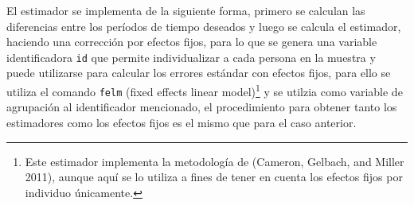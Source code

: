 \documentclass[]{article}
\begin{document}
El estimador se implementa de la siguiente forma, primero se calculan
las diferencias entre los períodos de tiempo deseados y luego se calcula
el estimador, haciendo una corrección por efectos fijos, para lo que se
genera una variable identificadora \texttt{id} que permite
individualizar a cada persona en la muestra y puede utilizarse para
calcular los errores estándar con efectos fijos, para ello se utiliza el
comando \texttt{felm} (fixed effects linear model)\footnote{Este
  estimador implementa la metodología de (Cameron, Gelbach, and Miller
  2011), aunque aquí se lo utiliza a fines de tener en cuenta los
  efectos fijos por individuo únicamente.} y se utilzia como variable de
agrupación al identificador mencionado, el procedimiento para obtener
tanto los estimadores como los efectos fijos es el mismo que para el
caso anterior.
\end{document}
